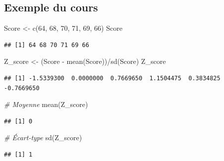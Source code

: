\documentclass[
]{article}
\newenvironment{Shaded}{\begin{snugshade}}{\end{snugshade}}
\newcommand{\CommentTok}[1]{\textcolor[rgb]{0.56,0.35,0.01}{\textit{#1}}}
\newcommand{\DecValTok}[1]{\textcolor[rgb]{0.00,0.00,0.81}{#1}}
\newcommand{\FunctionTok}[1]{\textcolor[rgb]{0.00,0.00,0.00}{#1}}
\newcommand{\NormalTok}[1]{#1}
\newcommand{\OtherTok}[1]{\textcolor[rgb]{0.56,0.35,0.01}{#1}}
\newcommand{\SpecialCharTok}[1]{\textcolor[rgb]{0.00,0.00,0.00}{#1}}
\begin{document}
\hypertarget{exemple-du-cours}{%
\subsection{Exemple du cours}\label{exemple-du-cours}}

\begin{Shaded}
\begin{Highlighting}[]
\NormalTok{Score }\OtherTok{\textless{}{-}} \FunctionTok{c}\NormalTok{(}\DecValTok{64}\NormalTok{, }\DecValTok{68}\NormalTok{, }\DecValTok{70}\NormalTok{, }\DecValTok{71}\NormalTok{, }\DecValTok{69}\NormalTok{, }\DecValTok{66}\NormalTok{)}
\NormalTok{Score}
\end{Highlighting}
\end{Shaded}

\begin{verbatim}
## [1] 64 68 70 71 69 66
\end{verbatim}

\begin{Shaded}
\begin{Highlighting}[]
\NormalTok{Z\_score }\OtherTok{\textless{}{-}}\NormalTok{ (Score }\SpecialCharTok{{-}} \FunctionTok{mean}\NormalTok{(Score))}\SpecialCharTok{/}\FunctionTok{sd}\NormalTok{(Score)}
\NormalTok{Z\_score}
\end{Highlighting}
\end{Shaded}

\begin{verbatim}
## [1] -1.5339300  0.0000000  0.7669650  1.1504475  0.3834825 -0.7669650
\end{verbatim}

\begin{Shaded}
\begin{Highlighting}[]
\CommentTok{\# Moyenne}
\FunctionTok{mean}\NormalTok{(Z\_score)}
\end{Highlighting}
\end{Shaded}

\begin{verbatim}
## [1] 0
\end{verbatim}

\begin{Shaded}
\begin{Highlighting}[]
\CommentTok{\# Écart{-}type}
\FunctionTok{sd}\NormalTok{(Z\_score)}
\end{Highlighting}
\end{Shaded}

\begin{verbatim}
## [1] 1
\end{verbatim}
\end{document}

